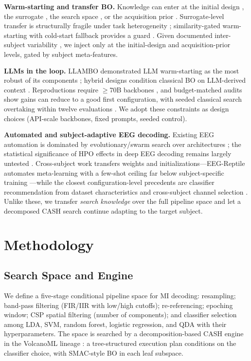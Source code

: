 \documentclass[conference]{IEEEtran}
\begin{document}
\textbf{Warm-starting and transfer BO.} Knowledge can enter at the initial design \cite{FeurerEtAl2015}, the surrogate \cite{WistubaGrabocka2021, LiEtAl2022c}, the search space \cite{LiEtAl2022d}, or the acquisition prior \cite{HvarfnerEtAl2022}. Surrogate-level transfer is structurally fragile under task heterogeneity \cite{HvarfnerEtAl2026}; similarity-gated warm-starting with cold-start fallback provides a guard \cite{NomuraEtAl2021}. Given documented inter-subject variability \cite{ZhangEtAl2024}, we inject only at the initial-design and acquisition-prior levels, gated by subject meta-features.

\textbf{LLMs in the loop.} LLAMBO demonstrated LLM warm-starting as the most robust of its components \cite{LiuEtAl2024}; hybrid designs condition classical BO on LLM-derived context \cite{XuEtAl2026a}. Reproductions require $\geq$70B backbones \cite{RychertEtAl2025}, and budget-matched audits show gains can reduce to a good first configuration, with seeded classical search overtaking within twelve evaluations \cite{RodriguesEtAl2026}. We adopt these constraints as design choices (API-scale backbones, fixed prompts, seeded control).

\textbf{Automated and subject-adaptive EEG decoding.} Existing EEG automation is dominated by evolutionary/swarm search over architectures \cite{NakisaEtAl2018, DuanEtAl2023, ZhuEtAl2025, WangEtAl2026}; the statistical significance of HPO effects in deep EEG decoding remains largely untested \cite{CooneyEtAl2020}. Cross-subject work transfers weights and initializations---EEG-Reptile automates meta-learning with a few-shot ceiling far below subject-specific training \cite{BerdyshevEtAl2024, SchirrmeisterEtAl2017}---while the closest configuration-level precedents are classifier recommendation from dataset characteristics \cite{AnarakiEtAl2024} and cross-subject channel selection \cite{WeiEtAl2023}. Unlike these, we transfer \emph{search knowledge} over the full pipeline space and let a decomposed CASH search continue adapting to the target subject.

\section{Methodology}
\label{sec:method}

\subsection{Search Space and Engine}
We define a five-stage conditional pipeline space for MI decoding: resampling; band-pass filtering (FIR/IIR with low/high cutoffs); re-referencing; epoching window; CSP spatial filtering (number of components); and classifier selection among LDA, SVM, random forest, logistic regression, and QDA with their hyperparameters. The space is searched by a decomposition-based CASH engine in the VolcanoML lineage \cite{LiEtAl2021b}: a tree-structured execution plan conditions on the classifier choice, with SMAC-style BO \cite{LindauerEtAl2021} in each leaf subspace.
\end{document}
